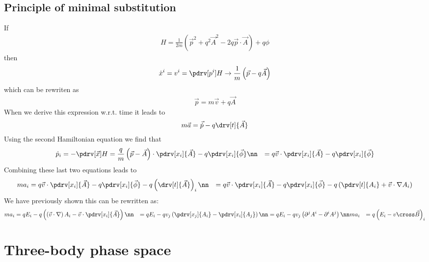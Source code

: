    \subsection{Principle of minimal substitution}
   If
   \begin{align}
     H = \frac{1}{2m}\left(\vec p^2+q^2\vec A^2-2q\vec p \cdot \vec A\right)+q\phi
   \end{align}
    then
    \begin{align}
      \dot x^i = v^i = \pdrv[p^i]H \to \frac{1}{m}\left(\vec p -q\vec A\right)
    \end{align}
    which can be rewriten as
   \begin{align}
     \vec p = m \vec v + q \vec A
   \end{align}
    When we derive this expression w.r.t. time it leads to
  \begin{align}
     m\vec a = \vec{{\dot p}}-q\drv[t]{\vec A}
  \end{align}
    Using the second Hamiltonian equation we find that
    \begin{align}
      {\dot p}_i = -\pdrv[\vec x]H &= \frac{q}{m}\left(\vec p -\vec A\right)\cdot \pdrv[x_i]{\vec A} - q\pdrv[x_i]{\vec \phi}\nn
      &= q\vec v\cdot \pdrv[x_i]{\vec A} - q\pdrv[x_i]{\vec \phi}
    \end{align}
    Combining these last two equations leads to
    \begin{align}
      m a_i &= q\vec v\cdot \pdrv[x_i]{\vec A} - q\pdrv[x_i]{\vec \phi}-q\left(\drv[t]{\vec A}\right)_i\nn
      &=q\vec v\cdot \pdrv[x_i]{\vec A} - q\pdrv[x_i]{\vec \phi}-q\left(\pdrv[t]{A_i} + \vec v\cdot\nabla A_i\right)
    \end{align}
    We have previously shown this can be rewritten as:
    \begin{align}
      ma_i &= qE_i -q \left(\left(\vec v\cdot\nabla\right)A_i-\vec v\cdot\pdrv[x_i]{\vec A}\right)\nn
      &= qE_i -q v_j\left(\pdrv[x_j]{A_i} - \pdrv[x_i]{A_j}\right)\nn
      &= qE_i -q v_j\left(\partial^j A^i - \partial^i A^j\right)\nn
      ma_i &= q\left(E_i - v \cross \vec B\right)_i
    \end{align}
    \section{Three-body phase space}
